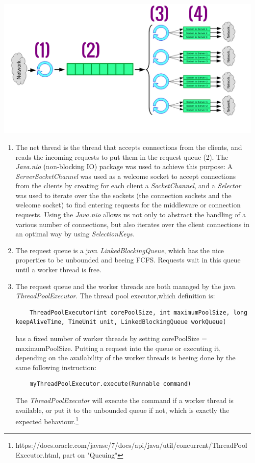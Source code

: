 \documentclass[11pt,a4paper]{article}
\begin{document}
\begin{center}
\includegraphics[scale=0.7]{baseIm.png}
\end{center}
\begin{enumerate}[ {(}1{)} ]
\item The net thread is the thread that accepts connections from the clients, and reads the incoming requests to put them in the request queue (2). The \textit{Java.nio} (non-blocking IO) package was used to achieve this purpose: A \textit{ServerSocketChannel} was used as a welcome socket to accept connections from the clients by creating for each client a \textit{SocketChannel}, and a \textit{Selector} was used to iterate over the the sockets (the connection sockets and the welcome socket) to find entering requests for the middleware or connection requests. Using the \textit{Java.nio} allows us not only to abstract the handling of a various number of connections, but also iterates over the client connections in an optimal way by using \textit{SelectionKeys}. 
\item The request queue is a java \textit{LinkedBlockingQueue}, which has the nice properties to be unbounded and beeing FCFS. Requests wait in this queue until a worker thread is free.   

\item The request queue and the worker threads are both managed by the java \textit{ThreadPoolExecutor}. The thread pool executor,which definition is: 
\begin{lstlisting}
	ThreadPoolExecutor(int corePoolSize, int maximumPoolSize, long keepAliveTime, TimeUnit unit, LinkedBlockingQueue workQueue)
\end{lstlisting} 
has a fixed number of worker threads by setting corePoolSize = maximumPoolSize. Putting a request into the queue or executing it, depending on the availability of the worker threads is beeing done by the same following instruction:
\begin{lstlisting}
	myThreadPoolExecutor.execute(Runnable command)
\end{lstlisting}
The \textit{ThreadPoolExecutor} will execute the command if a worker thread is available, or put it to the unbounded queue if not, which is exactly the expected behaviour.\footnote{https://docs.oracle.com/javase/7/docs/api/java/util/concurrent/ThreadPoolExecutor.html, part on "Queuing"}     
 

\end{enumerate}
\end{document}
